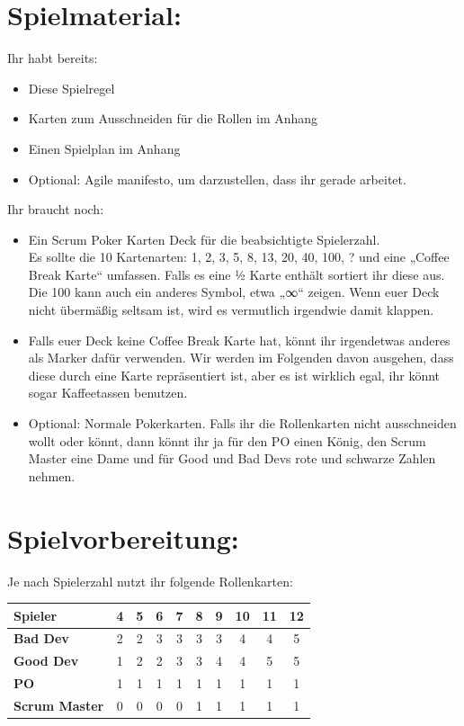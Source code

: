 \documentclass[10pt,a4paper]{article}
\begin{document}
\section{Spielmaterial:}

Ihr habt bereits:

\begin{itemize}
  \item Diese Spielregel
  \item Karten zum Ausschneiden für die Rollen im Anhang
  \item Einen Spielplan im Anhang
  \item Optional: Agile manifesto, um darzustellen, dass ihr gerade arbeitet.
\end{itemize}

Ihr braucht noch:

\begin{itemize}
  \item Ein Scrum Poker Karten Deck für die beabsichtigte Spielerzahl.\\
  Es sollte die 10 Kartenarten: 1, 2, 3, 5, 8, 13, 20, 40, 100, ? und eine „Coffee Break Karte“ umfassen. Falls es eine ½ Karte enthält sortiert ihr diese aus. Die 100 kann auch ein anderes Symbol, etwa „∞“ zeigen. Wenn euer Deck nicht übermäßig seltsam ist, wird es vermutlich irgendwie damit klappen.
  \item Falls euer Deck keine Coffee Break Karte hat, könnt ihr irgendetwas anderes als Marker dafür verwenden. Wir werden im Folgenden davon ausgehen, dass diese durch eine Karte repräsentiert ist, aber es ist wirklich egal, ihr könnt sogar Kaffeetassen benutzen.
  \item Optional: Normale Pokerkarten. Falls ihr die Rollenkarten nicht ausschneiden wollt oder könnt, dann könnt ihr ja für den PO einen König, den Scrum Master eine Dame und für Good und Bad Devs rote und schwarze Zahlen nehmen.
\end{itemize}

\section{Spielvorbereitung:}

Je nach Spielerzahl nutzt ihr folgende Rollenkarten:

\begin{center}
\small
\renewcommand{\arraystretch}{1.05}
\setlength{\tabcolsep}{4.4pt}
\begin{tabular}{|>{\bfseries}l|*{9}{c|}}
  \hline
  Spieler & 4 & 5 & 6 & 7 & 8 & 9 & 10 & 11 & 12 \\
  \hline
  Bad Dev & 2 & 2 & 3 & 3 & 3 & 3 & 4 & 4 & 5 \\
  \hline
  Good Dev & 1 & 2 & 2 & 3 & 3 & 4 & 4 & 5 & 5 \\
  \hline
  PO & 1 & 1 & 1 & 1 & 1 & 1 & 1 & 1 & 1 \\
  \hline
  Scrum Master & 0 & 0 & 0 & 0 & 1 & 1 & 1 & 1 & 1 \\
  \hline
\end{tabular}
\end{center}
\end{document}
